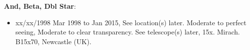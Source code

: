 {\bf And, Beta, Dbl Star}:
\begin{itemize}
\item xx/xx/1998 Mar 1998 to Jan 2015, See location(s) later. Moderate to perfect seeing, Moderate to clear transparency. See telescope(s) later, 15x. Mirach. B15x70, Newcastle (UK).
\end{itemize}
